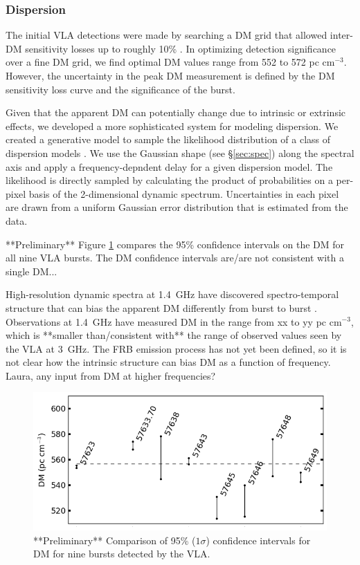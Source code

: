 \documentclass[twocolumn]{aastex61}
\begin{document}
\subsubsection{Dispersion}
The initial VLA detections were made by searching a DM grid that allowed inter-DM sensitivity losses up to roughly 10\% \citep[$\Delta DM=10 \rm{pc}\ \rm{cm}^{-3}$][]{2003ApJ...596.1142C}. In optimizing detection significance over a fine DM grid, we find optimal DM values range from 552 to 572 pc cm$^{-3}$. However, the uncertainty in the peak DM measurement is defined by the DM sensitivity loss curve and the significance of the burst. 

Given that the apparent DM can potentially change due to intrinsic or extrinsic effects, we developed a more sophisticated system for modeling dispersion. We created a generative model to sample the likelihood distribution of a class of dispersion models \citep{2010arXiv1008.4686H}. We use the Gaussian shape (see \S \ref{sec:spec}) along the spectral axis and apply a frequency-depndent delay for a given dispersion model. The likelihood is directly sampled by calculating the product of probabilities on a per-pixel basis of the 2-dimensional dynamic spectrum. Uncertainties in each pixel are drawn from a uniform Gaussian error distribution that is estimated from the data.

 **Preliminary** Figure \ref{fig:dmmodel} compares the 95\% confidence intervals on the DM for all nine VLA bursts. The DM confidence intervals {\color{red} are/are not} consistent with a single DM... %

High-resolution dynamic spectra at 1.4~GHz have discovered spectro-temporal structure that can bias the apparent DM differently from burst to burst \citep{WEIRD}. Observations at 1.4~GHz have measured DM in the range from xx to yy pc cm$^{-3}$, which is **smaller than/consistent with** the range of observed values seen by the VLA at 3~GHz. The FRB emission process has not yet been defined, so it is not clear how the intrinsic structure can bias DM as a function of frequency. {\color{red} Laura, any input from DM at higher frequencies?}

\begin{figure}[htb]
\begin{center}
\includegraphics[width=0.9\columnwidth]{dmmodel}
\caption{**Preliminary** Comparison of 95\% ($1\sigma$) confidence intervals for DM for nine bursts detected by the VLA.
\label{fig:dmmodel}}
\end{center}
\end{figure}
\end{document}
